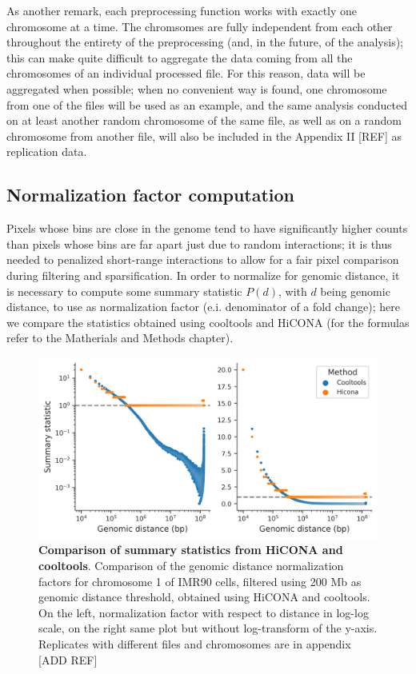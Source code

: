 As another remark, each preprocessing function works with exactly one chromosome at a time. The chromsomes are fully independent from each other throughout the entirety of the preprocessing (and, in the future, of the analysis); this can make quite difficult to aggregate the data coming from all the chromosomes of an individual processed file. For this reason, data will be aggregated when possible; when no convenient way is found, one chromosome from one of the files will be used as an example, and the same analysis conducted on at least another random chromosome of the same file, as well as on a random chromosome from another file, will also be included in the Appendix II [REF] as replication data.

\subsection{Normalization factor computation}

Pixels whose bins are close in the genome tend to have significantly higher counts than pixels whose bins are far apart just due to random interactions; it is thus needed to penalized short-range interactions to allow for a fair pixel comparison during filtering and sparsification. In order to normalize for genomic distance, it is necessary to compute some summary statistic $P(d)$, with $d$ being genomic distance, to use as normalization factor (e.i. denominator of a fold change); here we compare the statistics obtained using cooltools and HiCONA (for the formulas refer to the Matherials and Methods chapter). 

\begin{figure}[ht]
  \centering
  \includegraphics[width=1\textwidth]{hicona_vs_cooltools.png}
  \caption{\textbf{Comparison of summary statistics from HiCONA and cooltools}. Comparison of the genomic distance normalization factors for chromosome 1 of IMR90 cells, filtered using 200 Mb as genomic distance threshold, obtained using HiCONA and cooltools. On the left, normalization factor with respect to distance in log-log scale, on the right same plot but without log-transform of the y-axis. Replicates with different files and chromosomes are in appendix [ADD REF]}
  \label{fig:cooltools}
\end{figure}

